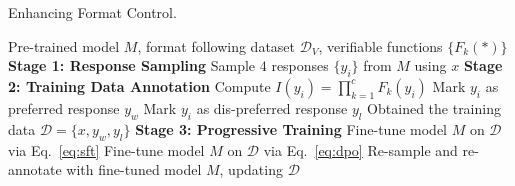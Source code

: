 \begin{algorithm}[t!]
    \small
    \centering
    \caption{Enhancing Format Control.}
    \begin{algorithmic}[1]
    \Require Pre-trained model $M$, format following dataset $\mathcal{D}_{V}$, verifiable functions $\{F_k(\ast)\}$
    \State \textbf{Stage 1: Response Sampling}
        \State Sample $4$ responses $\{y_i\}$ from $M$ using $x$
    \EndFor
    \State
    \State \textbf{Stage 2: Training Data Annotation}
        \State Compute $I(y_i) = \prod_{k=1}^{c} F_k(y_i)$
            \State Mark $y_i$ as preferred response $y_w$
        \Else
            \State Mark $y_i$ as dis-preferred response $y_l$
        \EndIf
    \EndFor
    \State Obtained the training data $\mathcal{D}=\{x, y_w, y_l\}$
    \State
    \State \textbf{Stage 3: Progressive Training}
            \State Fine-tune model $M$ on $\mathcal{D}$ via Eq.~\ref{eq:sft}
            \State Fine-tune model $M$ on $\mathcal{D}$ via Eq.~\ref{eq:dpo} 
            \State Re-sample and re-annotate with fine-tuned model $M$, updating $\mathcal{D}$
    \EndFor
    \end{algorithmic}
    \label{alg:enhance}
\end{algorithm}
